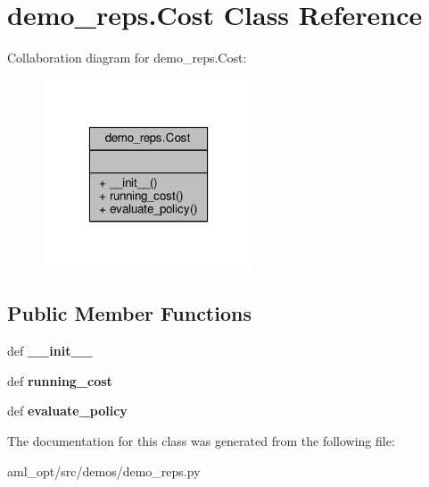 \hypertarget{classdemo__reps_1_1_cost}{\section{demo\-\_\-reps.\-Cost Class Reference}
\label{classdemo__reps_1_1_cost}
}


Collaboration diagram for demo\-\_\-reps.\-Cost\-:
\nopagebreak
\begin{figure}[H]
\begin{center}
\leavevmode
\includegraphics[width=178pt]{classdemo__reps_1_1_cost__coll__graph}
\end{center}
\end{figure}
\subsection*{Public Member Functions}
\begin{DoxyCompactItemize}
\item 
\hypertarget{classdemo__reps_1_1_cost_a5bab84d147db8f02e41863fee62ef18c}{def {\bfseries \-\_\-\-\_\-init\-\_\-\-\_\-}}\label{classdemo__reps_1_1_cost_a5bab84d147db8f02e41863fee62ef18c}

\item 
\hypertarget{classdemo__reps_1_1_cost_a7012ee32c36a1ddd927b24445614f4af}{def {\bfseries running\-\_\-cost}}\label{classdemo__reps_1_1_cost_a7012ee32c36a1ddd927b24445614f4af}

\item 
\hypertarget{classdemo__reps_1_1_cost_a4898e1724442ea1e580c7a66d264b2da}{def {\bfseries evaluate\-\_\-policy}}\label{classdemo__reps_1_1_cost_a4898e1724442ea1e580c7a66d264b2da}

\end{DoxyCompactItemize}


The documentation for this class was generated from the following file\-:\begin{DoxyCompactItemize}
\item 
aml\-\_\-opt/src/demos/demo\-\_\-reps.\-py\end{DoxyCompactItemize}

